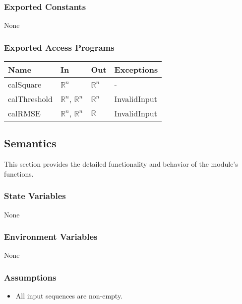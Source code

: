\documentclass[12pt, titlepage]{article}
\begin{document}
\subsubsection{Exported Constants}

None

\subsubsection{Exported Access Programs}

\begin{center}
\begin{tabular}{p{2cm} p{4cm} p{4cm} p{2cm}}
\hline
\textbf{Name} & \textbf{In} & \textbf{Out} & \textbf{Exceptions} \\
\hline
calSquare & $\mathbb{R}^n$ & $\mathbb{R}^n$ & - \\
calThreshold & $\mathbb{R}^n$, $\mathbb{R}^n$ & $\mathbb{R}^n$ & InvalidInput \\
calRMSE & $\mathbb{R}^n$, $\mathbb{R}^n$ & $\mathbb{R}$ & InvalidInput \\
\hline
\end{tabular}
\end{center}

\subsection{Semantics}

This section provides the detailed functionality and behavior of the module’s
functions.

\subsubsection{State Variables}

None

\subsubsection{Environment Variables}

None

\subsubsection{Assumptions}

\begin{itemize}
\item All input sequences are non-empty.
\end{itemize}
\end{document}
